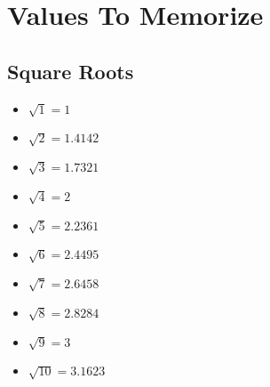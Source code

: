 \chapter{Values To Memorize}
\begin{multicols}{2}
\section{Square Roots}
\begin{itemize}
    \item \(\sqrt{1} = 1\)
    \item \(\sqrt{2} = 1.4142\)
    \item \(\sqrt{3} = 1.7321\)
    \item \(\sqrt{4} = 2\)
    \item \(\sqrt{5}= 2.2361\)
    \item \(\sqrt{6} = 2.4495\)
    \item \(\sqrt{7} = 2.6458\)
    \item \(\sqrt{8} = 2.8284\)
    \item \(\sqrt{9} = 3\)
    \item \(\sqrt{10} = 3.1623\)
\end{itemize}

\end{multicols}
